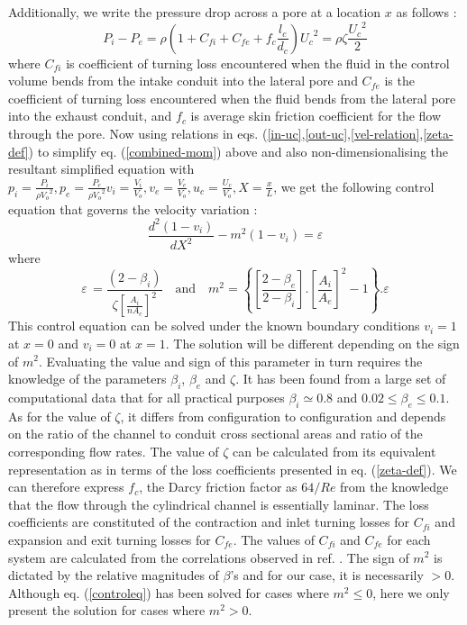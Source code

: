 \documentclass[twocolumn,10pt,cleanfoot]{ihmtc}
\begin{document}
%
Additionally, we write the pressure drop across a pore at a location
$x$ as follows : 
%
\begin{equation} \label{zeta-def}
{{P}_{i}}-{{P}_{e}}=\rho(1+{{C}_{fi}}+{{C}_{fe}}+{{f}_{c}}\frac{{{l}_{c}}}{{{d}_{c}}}){{U}_{c}}^{2}=\rho \zeta \frac{{{U}_{c}}^{2}}{2}
\end{equation}where $C_{fi}$ is coefficient of turning loss encountered when the fluid in the control volume bends from the intake conduit
into the lateral pore and $C_{fe}$ is the coefficient of turning loss encountered when the fluid bends from the
lateral pore into the exhaust conduit, and $f_c$ is average skin friction coefficient for the flow through the pore.
%
Now using relations in eqs. (\ref{in-uc},\ref{out-uc},\ref{vel-relation},\ref{zeta-def})
to simplify eq. (\ref{combined-mom}) above and also non-dimensionalising the resultant simplified equation with ${{p}_{i}}=\frac{{{P}_{i}}}{\rho{{V}_{o}}^{2}},{{p}_{e}}=\frac{{{P}_{e}}}{\rho{{V}_{o}}^{2}}{{v}_{i}}=\frac{{{V}_{i}}}{{{V}_{o}}},{{v}_{e}}=\frac{{{V}_{e}}}{{{V}_{o}}},{{u}_{c}}=\frac{{{U}_{c}}}{{{V}_{o}}},X=\frac{x}{L}$,
we get the following control equation that governs the velocity variation : 
%
\begin{equation} \label{controleq}
\frac{{{d}^{2}}(1-{{v}_{i}})}{d{{X}^{2}}}-{{m}^{2}}(1-{{v}_{i}})=\varepsilon
\end{equation}%
%
where 
%
\begin{equation} \label{msq}
\varepsilon\,=\frac{\left( 2-{{\beta }_{i}} \right)}{\zeta{{\left[\frac{{{A}_{i}}}{n{{A}_{c}}} \right]}^{2}}}\,\,\,\,\text{   and    }\,\,\,\,{{m}^{2}}=\left\{ \left[ \frac{2-{{\beta }_{e}}}{2-{{\beta }_{i}}} \right].{{\left[ \frac{{{A}_{i}}}{{{A}_{e}}} \right]}^{2}}-1 \right\}.\varepsilon
\end{equation}
%
%
This control equation can be solved under the known boundary conditions
$v_i=1$ at $x=0$ and $v_i=0$ at $x=1$. The solution will be different
depending on the sign of $m^2$. Evaluating the value and sign of this parameter in turn requires the knowledge of the parameters $\beta_i$, $ \beta_e $ and $\zeta$. It has been found from a large set
of computational data that for all practical purposes $\beta_i \simeq 0.8$
and $0.02 \leq \beta_e \leq 0.1$. As for the value of $\zeta$, it differs from configuration to configuration and depends on the ratio of the channel to conduit cross sectional areas and ratio of the corresponding flow rates. The value of $\zeta$ can be calculated from its equivalent representation as in terms of the loss coefficients presented in eq. (\ref{zeta-def}). We can therefore express $f_c$, the Darcy friction factor as $64/Re$ from the knowledge that the flow through the cylindrical channel is essentially laminar. The loss  coefficients are constituted of the contraction and inlet turning losses for $C_{fi}$ and expansion and exit turning losses for $C_{fe}$. The values of $C_{fi}$ and $C_{fe}$ for each system are calculated from the correlations observed in ref. \cite[Chapter~7]{idelchik2005handbook}. The sign of $m^2$ is dictated by the relative magnitudes of $\beta$'s and for our case, it is necessarily $>0$. Although eq. (\ref{controleq}) has been solved for cases where $m^2\leq0$, here we only present the solution for cases where $m^2>0$.\\
\end{document}
